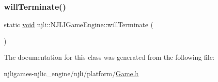 \mbox{\label{classnjli_1_1_n_j_l_i_game_engine_a830dbe46713d362957ac1a0671967b75}} 
\subsubsection{\texorpdfstring{will\+Terminate()}{willTerminate()}}
{\footnotesize\ttfamily static \mbox{\hyperlink{_thread_8h_af1e856da2e658414cb2456cb6f7ebc66}{void}} njli\+::\+N\+J\+L\+I\+Game\+Engine\+::will\+Terminate (\begin{DoxyParamCaption}{ }\end{DoxyParamCaption})\hspace{0.3cm}{\ttfamily [static]}}



The documentation for this class was generated from the following file\+:\begin{DoxyCompactItemize}
\item 
njligames-\/njlic\+\_\+engine/njli/platform/\mbox{\hyperlink{_game_8h}{Game.\+h}}\end{DoxyCompactItemize}
